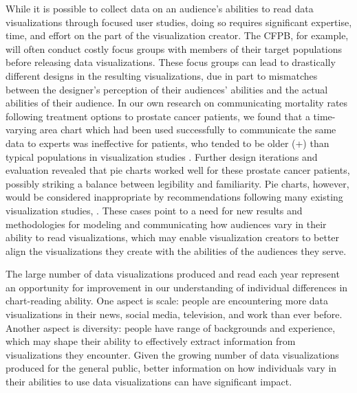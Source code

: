 \documentclass[11pt]{article}
\begin{document}
While it is possible to collect data on an audience's abilities to read data visualizations through focused user studies, doing so requires significant expertise, time, and effort on the part of the visualization creator.
The CFPB, for example, will often conduct costly focus groups with members of their target populations before releasing data visualizations.
These focus groups can lead to drastically different designs in the resulting visualizations, due in part to mismatches between the designer's perception of their audiences' abilities and the actual abilities of their audience.
In our own research on communicating mortality rates following treatment options to prostate cancer patients, we found that a time-varying area chart which had been used successfully to communicate the same data to experts was ineffective for patients, who tended to be older (+) than typical populations in visualization studies \cite{hakone2017proact}.
Further design iterations and evaluation revealed that pie charts worked well for these prostate cancer patients, possibly striking a balance between legibility and familiarity.
Pie charts, however, would be considered inappropriate by recommendations following many existing visualization studies, \eg \cite{cleveland1984graphical, simkin1987information, heer2010crowdsourcing}.
These cases point to a need for new results and methodologies for modeling and communicating how audiences vary in their ability to read visualizations, which may enable visualization creators to better align the visualizations they create with the abilities of the audiences they serve.

The large number of data visualizations produced and read each year represent an opportunity for improvement in our understanding of individual differences in chart-reading ability.
One aspect is scale: people are encountering more data visualizations in their news, social media, television, and work than ever before.
Another aspect is diversity: people have range of backgrounds and experience, which may shape their ability to effectively extract information from visualizations they encounter.
Given the growing number of data visualizations produced for the general public, better information on how individuals vary in their abilities to use data visualizations can have significant impact.
\end{document}
